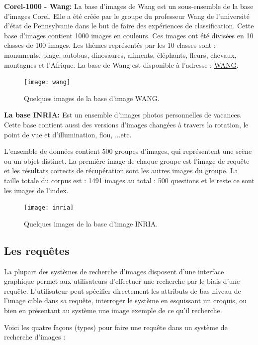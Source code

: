 \textbf{Corel-1000 - Wang:}
La base d’images de Wang est un sous-ensemble de la base d’images
Corel. Elle a été créée par le groupe du professeur Wang de l'université d'état de Pennsylvanie dans le but de faire des expériences de classification.
Cette base d’images contient 1000 images en couleurs. Ces images ont été divisées en 10 classes de 100 images. Les thèmes représentés par les 10 classes sont : monuments, plage, autobus, dinosaures, aliments, éléphants, fleurs, chevaux, montagnes et l’Afrique.
La base de Wang est disponible à l’adresse : \href{http://wang.ist.psu.edu/}{WANG}.
\begin{figure}[H]
	\centering
	\texttt{[image: wang]} 
	\caption{Quelques images de la base d’image WANG.}
\end{figure}

\textbf{La base INRIA:}
Est un ensemble d’images photos personnelles de vacances. Cette base contient aussi des versions d’images changées à travers la rotation, le point de vue et d’illumination, flou, ...etc.

L’ensemble de données contient 500 groupes d’images, qui représentent une scène ou un objet distinct. La première image de chaque groupe est l’image de requête et les résultats corrects de récupération sont les autres images du groupe. La taille totale du corpus est : 1491 images au total : 500 questions et le reste ce sont les images de l’index. 

\begin{figure}[H]
	\centering
	\texttt{[image: inria]} 
	\caption{Quelques images de la base d’image INRIA.}
\end{figure}


\subsection{Les requêtes}
La plupart des systèmes de recherche d’images disposent d'une interface graphique permet aux utilisateurs d'effectuer une recherche par le biais d'une requête. L’utilisateur peut spécifier directement les attributs de bas niveau de l'image cible dans sa requête, interroger le système en esquissant un croquis, ou bien en présentant au système une image exemple de ce qu'il recherche.

Voici les quatre façons (types) pour faire une requête dans un système de recherche d'images :

